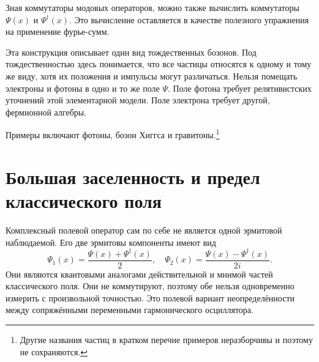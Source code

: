 Зная коммутаторы модовых операторов, можно также вычислить коммутаторы \(\Psi(x)\) и \(\Psi^\dagger(x)\). Это вычисление оставляется в качестве полезного упражнения на применение фурье-сумм.

Эта конструкция описывает один вид тождественных бозонов. Под тождественностью здесь понимается, что все частицы относятся к одному и тому же виду, хотя их положения и импульсы могут различаться. Нельзя помещать электроны и фотоны в одно и то же поле \(\Psi\). Поле фотона требует релятивистских уточнений этой элементарной модели. Поле электрона требует другой, фермионной алгебры.

\begin{classroomqa}
\end{classroomqa}


Примеры включают фотоны, бозон Хиггса и гравитоны.\footnote{Другие названия частиц в кратком перечне примеров неразборчивы и поэтому не сохраняются.}

\section{Большая заселенность и предел классического поля}

Комплексный полевой оператор сам по себе не является одной эрмитовой наблюдаемой. Его две эрмитовы компоненты имеют вид
\begin{equation}
\Psi_1(x)=\frac{\Psi(x)+\Psi^\dagger(x)}{2},
\quad
\Psi_2(x)=\frac{\Psi(x)-\Psi^\dagger(x)}{2i}.
\end{equation}
Они являются квантовыми аналогами действительной и мнимой частей классического поля. Они не коммутируют, поэтому обе нельзя одновременно измерить с произвольной точностью. Это полевой вариант неопределённости между сопряжёнными переменными гармонического осциллятора.

